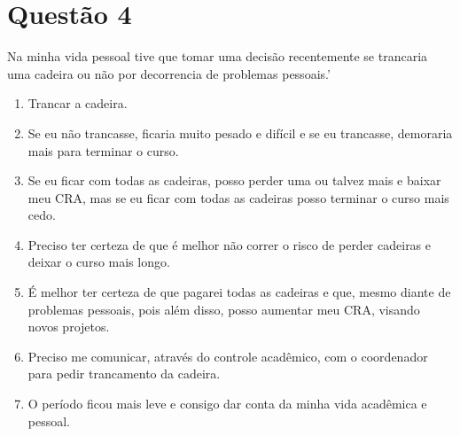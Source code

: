 \documentclass[a4paper,10pt]{article}
\begin{document}
\section{Questão 4}
Na minha vida pessoal tive que tomar uma decisão recentemente se trancaria uma cadeira ou não por decorrencia de problemas pessoais.'
\begin{enumerate}
\item Trancar a cadeira.
\item Se eu não trancasse, ficaria muito pesado e difícil e se eu trancasse, demoraria mais para terminar o curso.
\item Se eu ficar com todas as cadeiras, posso perder uma ou talvez mais e baixar meu CRA, mas se eu ficar com todas as cadeiras posso terminar o curso mais cedo.
\item Preciso ter certeza de que é melhor não correr o risco de perder cadeiras e deixar o curso mais longo.
\item É melhor ter certeza de que pagarei todas as cadeiras e que, mesmo diante de problemas pessoais, pois além disso, posso aumentar meu CRA, visando novos projetos.
\item Preciso me comunicar, através do controle acadêmico, com o coordenador para pedir trancamento da cadeira.
\item O período ficou mais leve e consigo dar conta da minha vida acadêmica e pessoal.
  \end{enumerate}
  
\end{document}
